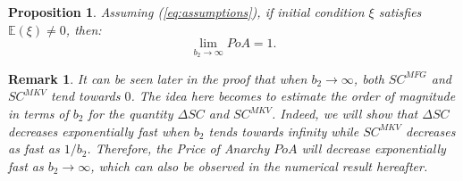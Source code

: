 \documentclass[11pt]{article}
\newtheorem{remark}{Remark}
\newtheorem{proposition}{Proposition}
\begin{document}
\begin{proposition}
	Assuming (\ref{eq:assumptions}), if initial condition $\xi$ satisfies $\mathbb{E}(\xi)\neq 0$, then:
	$$ \lim_{b_2 \to \infty} PoA = 1.$$	
\label{prop:b2_to_infty}
\end{proposition}

\begin{remark}
	It can be seen later in the proof that when $b_2 \to \infty$, both $SC^{MFG}$ and $SC^{MKV}$ tend towards $0$. The idea here becomes to estimate the order of magnitude in terms of $b_2$ for the quantity $\Delta SC$ and $SC^{MKV}$. Indeed, we will show that $\Delta SC$ decreases exponentially fast when $b_2$ tends towards infinity while $SC^{MKV}$ decreases as fast as $1/b_2$. Therefore, the Price of Anarchy $PoA$ will decrease exponentially fast as $b_2 \to \infty$, which can also be observed in the numerical result hereafter. 
\end{remark}
\end{document}
